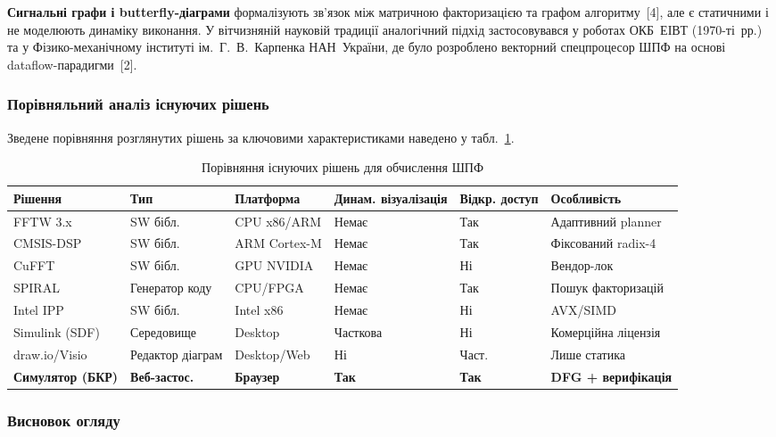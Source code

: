 \documentclass[14pt,a4paper]{extarticle}
\begin{document}
\textbf{Сигнальні графи і butterfly-діаграми} формалізують зв'язок
між матричною факторизацією та графом алгоритму~[4], але є
статичними і не моделюють динаміку виконання. У вітчизняній науковій
традиції аналогічний підхід застосовувався у роботах ОКБ~ЕІВТ
(1970-ті~рр.) та у Фізико-механічному інституті ім.~Г.~В.~Карпенка
НАН~України, де було розроблено векторний спецпроцесор ШПФ на основі
dataflow-парадигми~[2].

\subsubsection*{Порівняльний аналіз існуючих рішень}

Зведене порівняння розглянутих рішень за ключовими характеристиками
наведено у табл.~\ref{tab:solutions}.

\begin{table}[H]
  \caption{Порівняння існуючих рішень для обчислення ШПФ}
  \label{tab:solutions}
  \centering
  \small
  \begin{tabular}{p{2.4cm}p{2.0cm}p{1.8cm}p{1.6cm}p{1.4cm}p{2.6cm}}
    \toprule
    Рішення & Тип & Платформа & Динам. візуалізація & Відкр. доступ & Особливість \\
    \midrule
    FFTW 3.x      & SW бібл.        & CPU x86/ARM & Немає & Так   & Адаптивний planner \\
    CMSIS-DSP     & SW бібл.        & ARM Cortex-M & Немає & Так   & Фіксований radix-4 \\
    CuFFT         & SW бібл.        & GPU NVIDIA  & Немає & Ні    & Вендор-лок \\
    SPIRAL        & Генератор коду  & CPU/FPGA    & Немає & Так   & Пошук факторизацій \\
    Intel IPP     & SW бібл.        & Intel x86   & Немає & Ні    & AVX/SIMD \\
    Simulink (SDF)& Середовище     & Desktop     & Часткова & Ні & Комерційна ліцензія \\
    draw.io/Visio & Редактор діаграм & Desktop/Web & Ні    & Част. & Лише статика \\
    \textbf{Симулятор (БКР)} & \textbf{Веб-застос.} & \textbf{Браузер} & \textbf{Так} & \textbf{Так} & \textbf{DFG + верифікація} \\
    \bottomrule
  \end{tabular}
\end{table}

\subsubsection*{Висновок огляду}
\end{document}
